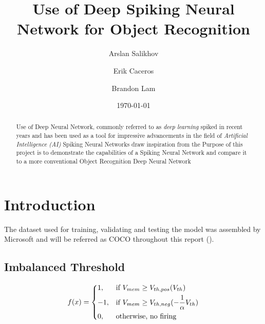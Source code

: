 \documentclass{article}
\title{Use of Deep Spiking Neural Network for Object Recognition}
\author{Arslan Salikhov  \\
	\and 
	Erik Caceros \\
	\and
	Brandon Lam \\
	}
\date{\today}
\begin{document}
\begin{titlingpage}
\maketitle
\end{titlingpage}


\tableofcontents
\newpage


\begin{abstract}
Use of Deep Neural Network, commonly referred to as
\emph{deep learning} spiked in recent years and has been used
as a tool for impressive advancements in the field of 
\emph{Artificial Intelligence (AI)}
Spiking Neural Networks draw inspiration from the 
Purpose of this project is to demonstrate the capabilities of a 
Spiking Neural Network and compare it to a more conventional 
Object Recognition Deep Neural Network
\end{abstract}

\section{Introduction}

The dataset used for training, validating and testing the 
model was assembled by Microsoft and will be referred as
COCO throughout this report ().

\subsection{Imbalanced Threshold} 
\[
    f(x)= 
\begin{dcases}
    1 ,& \text{if } {V_{mem}}\geq V_{th,pos}(V_{th})\\
	-1 ,& \text{if } {V_{mem}}\geq V_{th,neg}(-\frac{1}{\alpha}V_{th})\\
    0,              & \text{otherwise, no firing}
\end{dcases}
\]

\newpage


\end{document}
